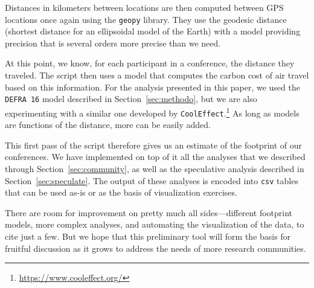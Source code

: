 Distances in kilometers between locations are then computed between GPS
locations once again using the \texttt{geopy} library. They use the geodesic
distance (shortest distance for an ellipsoidal model of the Earth) with a
model providing precision that is several orders more precise than we need.

At this point, we know, for each participant in a conference, the
distance they traveled. The script then uses a model that computes the
carbon cost of air travel based on this information. For the analysis
presented in this paper, we used the \texttt{DEFRA 16} model described in
Section~\ref{sec:methodo}, but we are also experimenting with a similar one
developed by
\texttt{CoolEffect}.\footnote{\url{https://www.cooleffect.org/}}  As long as
models are functions of the distance, more can be easily added.

This first pass of the script therefore gives us an estimate of the
footprint of our conferences. We have implemented on top of it all the
analyses that we described through Section~\ref{sec:community}, as well as
the speculative analysis described in Section~\ref{sec:speculate}. The
output of these analyses is encoded into \texttt{csv} tables that can be
used as-is or as the basis of visualization exercises.

There are room for improvement on pretty much all sides---different
footprint models, more complex analyses, and automating the visualization of
the data, to cite just a few. But we hope that this preliminary tool will
form the basis for fruitful discussion as it grows to address the needs of
more research communities.
